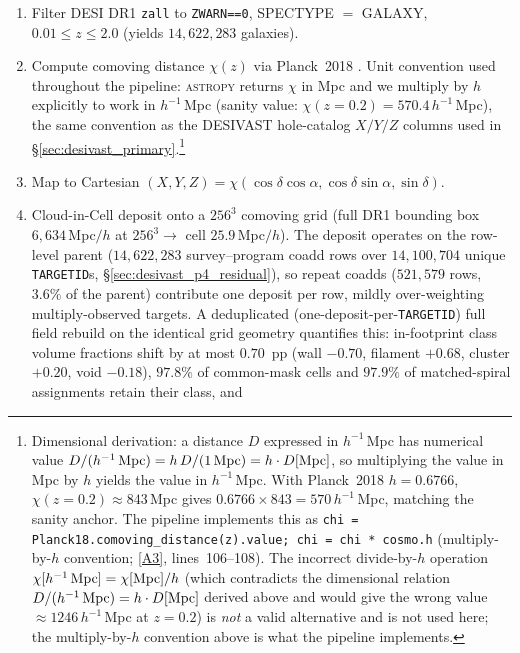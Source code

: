 \documentclass[aps,prd,twocolumn,superscriptaddress,showpacs,preprintnumbers,nofootinbib,longbibliography,floatfix]{revtex4-2}
\newcommand{\repoBase}{https://github.com/Hubify-Projects/bigbounce/blob/main}
\begin{document}
\begin{enumerate}
\item Filter DESI DR1 \texttt{zall} to \texttt{ZWARN==0}, SPECTYPE
$=$ GALAXY, $0.01 \le z \le 2.0$ (yields $14{,}622{,}283$ galaxies).
\item Compute comoving distance $\chi(z)$ via Planck~2018
\cite{Planck2018cosmoparams}. Unit convention used throughout the
pipeline: \textsc{astropy} returns $\chi$ in Mpc and we multiply by
$h$ explicitly to work in $h^{-1}$\,Mpc (sanity value:
$\chi(z\!=\!0.2) = 570.4\,h^{-1}$\,Mpc), the same convention as the
DESIVAST hole-catalog $X/Y/Z$ columns used in
\S\ref{sec:desivast_primary}.\footnote{Dimensional derivation:
a distance $D$ expressed in $h^{-1}$\,Mpc has numerical value
$D/(h^{-1}\,{\rm Mpc}) = h\,D/(1\,{\rm Mpc}) = h\cdot D[{\rm Mpc}]$, so
multiplying the value in Mpc by $h$ yields the value in $h^{-1}$\,Mpc.
With Planck~2018 $h=0.6766$, $\chi(z\!=\!0.2)\!\approx\!843$\,Mpc gives
$0.6766 \times 843 = 570\,h^{-1}$\,Mpc, matching the sanity anchor.
The pipeline implements this as
\texttt{chi = Planck18.comoving\_distance(z).value;
chi = chi * cosmo.h} (multiply-by-$h$ convention;
\href{\repoBase/pipelines/p5\_desi\_chirality/env\_finder/01\_compute\_vweb.py}{[A3]},
lines~106--108). The incorrect divide-by-$h$ operation
$\chi[h^{-1}\,{\rm Mpc}] = \chi[{\rm Mpc}]/h$ (which contradicts the
dimensional relation $D/(h^{-1}\,{\rm Mpc}) = h\cdot D[{\rm Mpc}]$ derived
above and would give the wrong value ${\approx}1246\,h^{-1}$\,Mpc at
$z=0.2$) is \emph{not} a valid alternative and is not used here; the
multiply-by-$h$ convention above is what the pipeline implements.}
\item Map to Cartesian
$(X,Y,Z) = \chi (\cos\delta\cos\alpha, \cos\delta\sin\alpha,
\sin\delta)$.
\item Cloud-in-Cell deposit onto a $256^3$ comoving grid (full DR1
bounding box $6{,}634$\,Mpc$/h$ at $256^3 \to$ cell $25.9$\,Mpc$/h$).
The deposit operates on the row-level parent ($14{,}622{,}283$
survey--program coadd rows over $14{,}100{,}704$ unique
\texttt{TARGETID}s, \S\ref{sec:desivast_p4_residual}), so repeat
coadds ($521{,}579$ rows, $3.6\%$ of the parent) contribute one
deposit per row, mildly over-weighting multiply-observed targets. A
deduplicated (one-deposit-per-\texttt{TARGETID}) full field rebuild on
the identical grid geometry quantifies this: in-footprint class volume
fractions shift by at most $0.70$~pp (wall $-0.70$, filament $+0.68$,
cluster $+0.20$, void $-0.18$), $97.8\%$ of common-mask cells and
$97.9\%$ of matched-spiral assignments retain their class, and

\end{enumerate}
\end{document}
